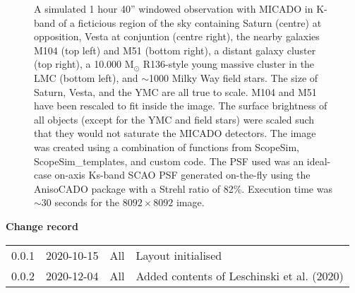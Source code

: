 \documentclass[a4paper,11pt]{article}
\begin{document}

\dmdmaketitle

\begin{figure}

\caption{A simulated 1 hour 40'' windowed observation with MICADO in K-band of a ficticious region of the sky containing Saturn (centre) at opposition, Vesta at conjuntion (centre right), the nearby galaxies M104 (top left) and M51 (bottom right), a distant galaxy cluster (top right), a 10.000 M$_\odot$ R136-style young massive cluster in the LMC (bottom left), and $\sim$1000 Milky Way field stars.
The size of Saturn, Vesta, and the YMC are all true to scale.
M104 and M51 have been rescaled to fit inside the image.
The surface brightness of all objects (except for the YMC and field stars) were scaled such that they would not saturate the MICADO detectors.
The image was created using a combination of functions from ScopeSim, ScopeSim\_templates, and custom code.
The PSF used was an ideal-case on-axis Ks-band SCAO PSF generated on-the-fly using the AnisoCADO package with a Strehl ratio of 82\%.
Execution time was $\sim$30 seconds for the $8092\times8092$ image.
}
\label{fig-title-page}

\end{figure}


\begin{center}
  \textbf{Change record}

  \tabletail{\hline}

  \begin{supertabular}{|l|l|l|l|}
   0.0.1 & 2020-10-15 & All & Layout initialised \\
   0.0.2 & 2020-12-04 & All & Added contents of Leschinski et al. (2020) \\
   \hline
  \end{supertabular}

\end{center}
\end{document}
